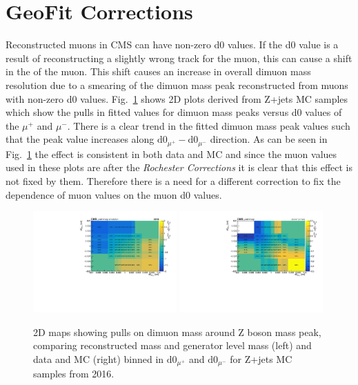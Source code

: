 \section{GeoFit Corrections}
\label{sec:app_geofitcorr}
Reconstructed muons in CMS can have non-zero d0 values. If the d0 value is a result of reconstructing a slightly wrong track for the muon, this can cause a shift in the \pt of the muon. This \pt shift causes an increase in overall dimuon mass resolution due to a smearing of the dimuon mass peak reconstructed from muons with non-zero d0 values. Fig.~\ref{fig:2D_Z_mass_vs_d0} shows 2D plots derived from Z+jets MC samples which show the pulls in fitted values for dimuon mass peaks versus d0 values of the $\mu^+$ and $\mu^-$. There is a clear trend in the fitted dimuon mass peak values such that the peak value increases along $\text{d0}_{\mu^+}-\text{d0}_{\mu^-}$ direction. As can be seen in Fig.~\ref{fig:2D_Z_mass_vs_d0} the effect is consistent in both data and MC and since the muon \pt values used in these plots are after the \textit{Rochester Corrections} it is clear that this effect is not fixed by them. Therefore there is a need for a different correction to fix the dependence of muon \pt values on the muon d0 values. 

\begin{figure}[h!]
    \centering
    \includegraphics[width=0.49\textwidth]{images_geofit/2D_Z_mass_vs_d0_pulls.pdf}
    \includegraphics[width=0.49\textwidth]{images_geofit/2D_Z_mass_vs_d0_data_MC.pdf}
    \caption{2D maps showing pulls on dimuon mass around Z boson mass peak, comparing reconstructed mass and generator level mass (left) and data and MC (right) binned in $\text{d0}_{\mu^+}$ and $\text{d0}_{\mu^-}$ for Z+jets MC samples from 2016.}
    \label{fig:2D_Z_mass_vs_d0}
\end{figure}

